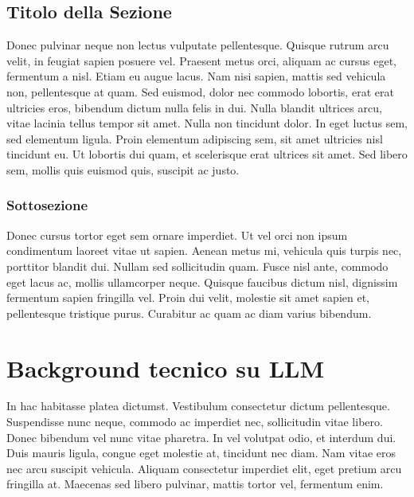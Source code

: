 \documentclass[target=mst,aauheader=,style=]{thud}
\begin{document}
\section{Titolo della Sezione}
Donec pulvinar neque non lectus vulputate pellentesque. Quisque rutrum arcu velit, in feugiat sapien posuere vel. Praesent metus orci, aliquam ac cursus eget, fermentum a nisl. Etiam eu augue lacus. Nam nisi sapien, mattis sed vehicula non, pellentesque at quam. Sed euismod, dolor nec commodo lobortis, erat erat ultricies eros, bibendum dictum nulla felis in dui. Nulla blandit ultrices arcu, vitae lacinia tellus tempor sit amet. Nulla non tincidunt dolor. In eget luctus sem, sed elementum ligula. Proin elementum adipiscing sem, sit amet ultricies nisl tincidunt eu. Ut lobortis dui quam, et scelerisque erat ultrices sit amet. Sed libero sem, mollis quis euismod quis, suscipit ac justo.

\subsection{Sottosezione}
Donec cursus tortor eget sem ornare imperdiet. Ut vel orci non ipsum condimentum laoreet vitae ut sapien. Aenean metus mi, vehicula quis turpis nec, porttitor blandit dui. Nullam sed sollicitudin quam. Fusce nisl ante, commodo eget lacus ac, mollis ullamcorper neque. Quisque faucibus dictum nisl, dignissim fermentum sapien fringilla vel. Proin dui velit, molestie sit amet sapien et, pellentesque tristique purus. Curabitur ac quam ac diam varius bibendum.

\chapter{Background tecnico su LLM}
In hac habitasse platea dictumst. Vestibulum consectetur dictum pellentesque. Suspendisse nunc neque, commodo ac imperdiet nec, sollicitudin vitae libero. Donec bibendum vel nunc vitae pharetra. In vel volutpat odio, et interdum dui. Duis mauris ligula, congue eget molestie at, tincidunt nec diam. Nam vitae eros nec arcu suscipit vehicula. Aliquam consectetur imperdiet elit, eget pretium arcu fringilla at. Maecenas sed libero pulvinar, mattis tortor vel, fermentum enim.

\end{document}
